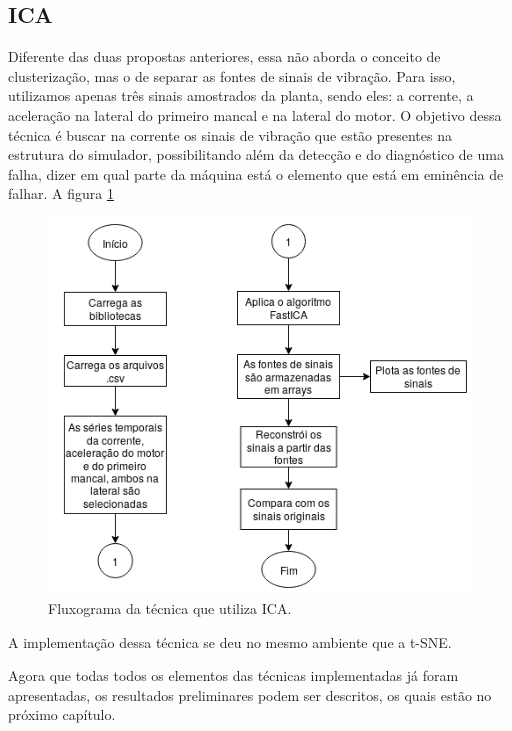 %  

\subsection{ICA}

Diferente das duas propostas anteriores, essa não aborda o conceito de clusterização, mas o de separar as fontes de sinais de vibração.
Para isso, utilizamos apenas três sinais amostrados da planta, sendo eles: a corrente, a aceleração na lateral do primeiro mancal e 
na lateral do motor. O objetivo dessa técnica é buscar na corrente os sinais de vibração que estão presentes na estrutura do simulador,
possibilitando além da detecção e do diagnóstico de uma falha, dizer em qual parte da máquina está o elemento que está em eminência de 
falhar. A figura \ref{fig:ica}

\begin{figure}[H]
    \caption{Fluxograma da técnica que utiliza ICA.}
    \begin{center}
        \includegraphics[scale=.65]{metodologia/img/ica.png}
    \end{center}
    \label{fig:ica}
\end{figure}


A implementação dessa técnica se deu no mesmo ambiente que a t-SNE.

Agora que todas todos os elementos das técnicas implementadas já foram apresentadas, os resultados preliminares podem ser descritos, os 
quais estão no próximo capítulo.